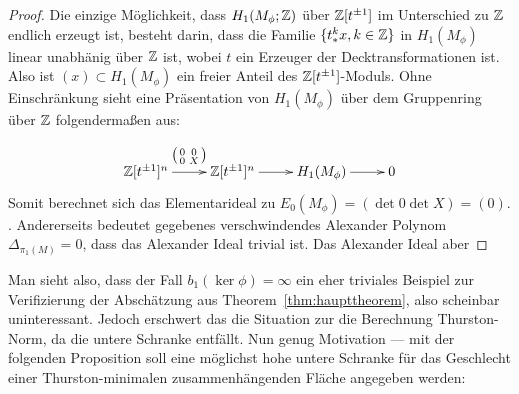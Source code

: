     \begin{proof}
    	Die einzige Möglichkeit, dass $H_1(M_\phi;\mathbb{Z})$ über $\mathbb{Z}[t^{\pm 1}]$ im Unterschied zu $\mathbb{Z}$ endlich erzeugt ist, besteht darin, dass die Familie $\{t_*^kx,k\in\mathbb{Z}\}$ in $H_1(M_\phi)$ linear unabhänig über $\mathbb{Z}$ ist, wobei $t$ ein Erzeuger der Decktransformationen ist. Also ist $(x)\subset H_1(M_\phi)$ ein freier Anteil des $\mathbb{Z}[t^{\pm 1}]$-Moduls. Ohne Einschränkung sieht eine Präsentation von $H_1(M_\phi)$ über dem Gruppenring über $\mathbb{Z}$ folgendermaßen aus:
    	\[
    		\begin{xy}
    			\xymatrix@L+3pt{\laurent \ZZ t ^n \ar[r]^{\bigl(\begin{smallmatrix}0&0\\0&X\end{smallmatrix}\bigr)} & \laurent \ZZ t ^n \ar[r] &H_1(M_\phi) \ar[r] &0}
    		\end{xy}
    	\]
    	Somit berechnet sich das Elementarideal zu $E_0(M_\phi)=(\det 0\det X)=(0)$.\\ .
    	Andererseits bedeutet gegebenes verschwindendes Alexander Polynom $\Delta_{\pi_1(M)}=0$, dass das Alexander Ideal trivial ist. Das Alexander Ideal aber 
    \end{proof}

    Man sieht also, dass der Fall $b_1(\ker\phi)=\infty$ ein eher triviales Beispiel zur Verifizierung der Abschätzung aus Theorem~\ref{thm:haupttheorem}, also scheinbar uninteressant. Jedoch erschwert das die Situation zur die Berechnung Thurston-Norm, da die untere Schranke entfällt. Nun genug Motivation --- mit der folgenden Proposition soll eine möglichst hohe untere Schranke für das Geschlecht einer Thurston-minimalen zusammenhängenden Fläche angegeben werden:

